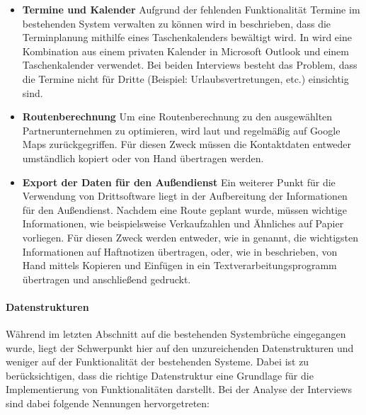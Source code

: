 \documentclass[Bachelorarbeit.tex]{subfiles}
\begin{document}
\begin{itemize}
\item \textbf{Termine und Kalender}
Aufgrund der fehlenden Funktionalität Termine im bestehenden System verwalten zu können wird in  beschrieben, dass die Terminplanung mithilfe eines Taschenkalenders bewältigt wird. 
In  wird eine Kombination aus einem privaten Kalender in Microsoft Outlook und einem Taschenkalender verwendet. 
Bei beiden Interviews besteht das Problem, dass die Termine nicht für Dritte (Beispiel: Urlaubsvertretungen, etc.) einsichtig sind.

\item \textbf{Routenberechnung}
Um eine Routenberechnung zu den ausgewählten Partnerunternehmen zu optimieren, wird laut  und  regelmäßig auf Google Maps zurückgegriffen. 
Für diesen Zweck müssen die Kontaktdaten entweder umständlich kopiert oder von Hand übertragen werden.

\item \textbf{Export der Daten für den Außendienst}
Ein weiterer Punkt für die Verwendung von Drittsoftware liegt in der Aufbereitung der Informationen für den Außendienst.
Nachdem eine Route geplant wurde, müssen wichtige Informationen, wie beispielsweise Verkaufzahlen und Ähnliches auf Papier vorliegen. 
Für diesen Zweck werden entweder, wie in  genannt, die wichtigsten Informationen auf Haftnotizen übertragen, oder, wie in  beschrieben, von Hand mittels Kopieren und Einfügen in ein Textverarbeitungsprogramm übertragen und anschließend gedruckt.
\end{itemize}


\paragraph{Datenstrukturen}
\label{interviewsAnalyseDatenstrukturen}
Während im letzten Abschnitt auf die bestehenden Systembrüche eingegangen wurde, liegt der Schwerpunkt hier auf den unzureichenden Datenstrukturen und weniger auf der Funktionalität der bestehenden Systeme. 
Dabei ist zu berücksichtigen, dass die richtige Datenstruktur eine Grundlage für die Implementierung von Funktionalitäten darstellt. 
Bei der Analyse der Interviews sind dabei folgende Nennungen hervorgetreten:
\end{document}
